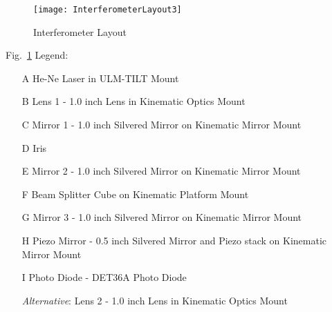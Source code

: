 \begin{figure}[ht]
\centering
\texttt{[image: InterferometerLayout3]}
\caption{Interferometer Layout}
\label{fig:interferometer}
\end{figure}
\newpage
Fig.~\ref{fig:interferometer} Legend:
\begin{enumerate} \itemsep1pt \parskip0pt 
   \item[A] He-Ne Laser in ULM-TILT Mount
   \item[B] Lens 1 - 1.0 inch Lens in Kinematic Optics Mount
   \item[C] Mirror 1 - 1.0 inch Silvered Mirror on Kinematic Mirror Mount
   \item[D] Iris
   \item[E] Mirror 2 - 1.0 inch Silvered Mirror on Kinematic Mirror Mount
   \item[F] Beam Splitter Cube on Kinematic Platform Mount
   \item[G] Mirror 3 - 1.0 inch Silvered Mirror on Kinematic Mirror Mount
   \item[H] Piezo Mirror - 0.5 inch Silvered Mirror and Piezo stack on Kinematic Mirror Mount
   \item[I] Photo Diode - DET36A Photo Diode

    \emph{Alternative}: Lens 2 - 1.0 inch Lens in Kinematic Optics Mount
\end{enumerate}
